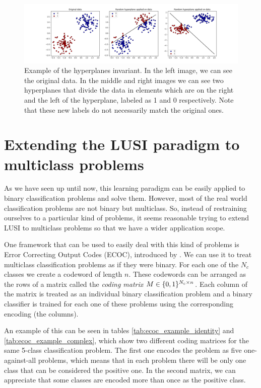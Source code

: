 \begin{figure}[h]
    \centering
    \includegraphics[width=\textwidth]{thesis/Figures/random_hyperplanes_example.png}
    \caption{Example of the hyperplanes invariant. In the left image, we can see the original data. In
    the middle and right images we can see two hyperplanes that divide the data in elements which are
    on the right and the left of the hyperplane, labeled as 1 and 0 respectively. Note that these
    new labels do not necessarily match the original ones.}
    \label{fig:random_hyperplanes_example}
\end{figure}

\section{Extending the LUSI paradigm to multiclass problems}

As we have seen up until now, this learning paradigm can be easily applied to binary classification problems
and solve them. However, most of the real world classification problems are not binary but multiclass.
So, instead of restraining ourselves to a particular kind of problems, it seems reasonable trying to extend
LUSI to multiclass problems so that we have a wider application scope.

One framework that can be used to easily deal with this kind of problems is Error Correcting Output Codes (ECOC),
introduced by \cite{DietrichBakiri1995}. We can use it to treat multiclass classification problems as if they
were binary. For each one of the $N_c$ classes we create a codeword of length $n$. These codewords can be arranged as
the rows of a matrix called the \emph{coding matrix} $M \in \lbrace 0, 1 \rbrace^{N_c \times n}$. Each column of the matrix
is treated as an individual binary classification problem and a binary classifier is trained for each one of these
problems using the corresponding encoding (the columns).

An example of this can be seen in tables \ref{tab:ecoc_example_identity} and \ref{tab:ecoc_example_complex},
which show two different coding matrices for the same 5-class classification problem. The first one encodes the
problem as five one-against-all problems, which means that in each problem there will be only one class that can be
considered the positive one. In the second matrix, we can appreciate that some classes are encoded more than
once as the positive class.

